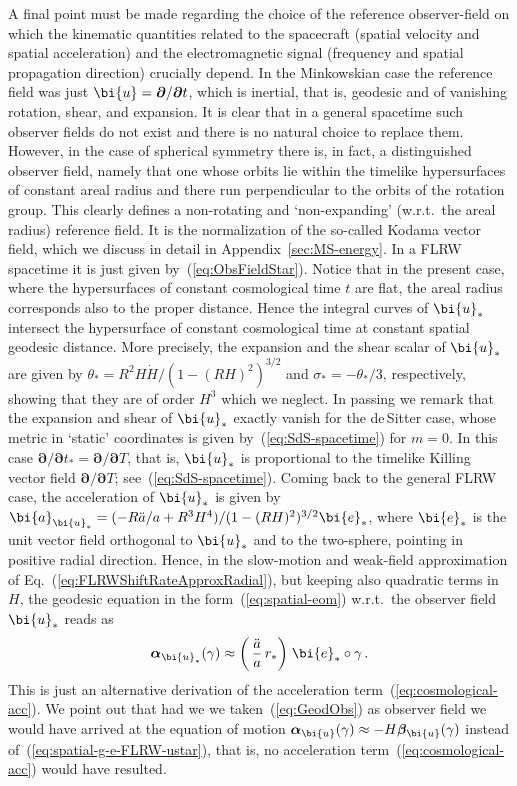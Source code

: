 \documentclass
[rmp,aps,twocolumn,showpacs,preprintnumbers,amsmath,amssymb]{revtex4}
\theoremstyle{plain}
\theoremstyle{definition}
\theoremstyle{remark}
\newcommand{\bpartial}{\boldsymbol{\partial}} %
\newcommand{\ba}{\bi{a}}
\newcommand{\be}{\bi{e}}
\newcommand{\bu}{\bi{u}}
\newcommand{\balpha}{\boldsymbol{\alpha}}
\newcommand{\bbeta}{{\boldsymbol{\beta}}}
\begin{document}
A final point must be made regarding the choice of the reference 
observer-field on which the kinematic quantities related to the 
spacecraft (spatial velocity and spatial acceleration) and the 
electromagnetic signal (frequency and spatial propagation direction) 
crucially depend. In the Minkowskian case the reference field 
was just $\bu=\bpartial/\bpartial t$, which is inertial, that is, 
geodesic and of vanishing rotation, shear, and expansion. It is 
clear that in a general spacetime such observer fields do not 
exist and there is no natural choice to replace them. However, 
in the case of spherical symmetry there is, in fact, a 
distinguished observer field, namely that one whose orbits lie 
within the timelike hypersurfaces of constant areal radius and 
there run perpendicular to the orbits of the rotation group. 
This clearly defines  a  non-rotating and `non-expanding' (w.r.t.~the 
areal radius) reference field. It is the normalization of 
the so-called Kodama vector field, which we discuss in detail in 
Appendix~\ref{sec:MS-energy}. In a FLRW spacetime it is just 
given by~(\ref{eq:ObsFieldStar}). Notice that in the present case, 
where the hypersurfaces of constant cosmological time $t$ are flat, 
the areal radius corresponds also to the proper distance. Hence 
the integral curves of $\bu_*$ intersect the hypersurface of constant 
cosmological time at constant spatial geodesic distance.
More precisely, the expansion and the shear scalar of $\bu_*$ are given 
by $\theta_*=R^2H\dot{H}/(1-(RH)^2)^{3/2}$ and $\sigma_*=-\theta_*/3$, 
respectively, showing that they are of order $H^3$ which we neglect. 
In passing we remark that the expansion and shear of $\bu_*$ exactly 
vanish for the de\,Sitter case, whose metric in `static' coordinates 
is given by~(\ref{eq:SdS-spacetime}) for $m=0$. In this case 
$\bpartial/\bpartial t_*=\bpartial/\bpartial T$, that is, $\bu_*$ is 
proportional to the timelike Killing vector field 
$\bpartial/\bpartial T$; see~(\ref{eq:SdS-spacetime}). Coming back 
to the general FLRW case, the acceleration of $\bu_*$ is given by 
$\ba_{\bu_*}=(-R\ddot{a}/a+R^3H^4)/(1-(RH)^2)^{3/2}\be_*$, where 
$\be_*$ is the unit vector field orthogonal to $\bu_*$ and to the 
two-sphere, pointing in positive radial direction. Hence, in the slow-motion 
and weak-field approximation of Eq.~(\ref{eq:FLRWShiftRateApproxRadial}), 
but keeping also quadratic terms in $H$, the geodesic equation in the 
form~(\ref{eq:spatial-eom}) w.r.t.~the observer field $\bu_*$ reads as 
%
\begin{equation}\label{eq:spatial-g-e-FLRW-ustar}
  \balpha_{\bu_*}(\gamma) \approx 
  \bigg( \, \frac{\ddot a}{a}\, r_* \bigg) \;\be_* \circ \gamma \,.
\end{equation}
%
This is just an alternative derivation of the acceleration 
term~(\ref{eq:cosmological-acc}). We point out that had we we 
taken~(\ref{eq:GeodObs}) as observer field we would have arrived at 
the equation of motion $\balpha_\bu(\gamma) \approx - H \bbeta_\bu(\gamma)$
instead of~(\ref{eq:spatial-g-e-FLRW-ustar}), that is, no acceleration 
term~(\ref{eq:cosmological-acc}) would have resulted.
\end{document}
